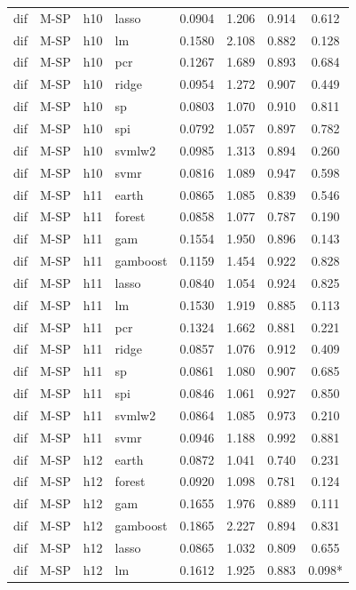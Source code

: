 \begin{ThreePartTable}
\begin{longtable}[t]{llclcccc}
dif & M-SP & h10 & lasso & 0.0904 & 1.206 & 0.914 & 0.612\\
dif & M-SP & h10 & lm & 0.1580 & 2.108 & 0.882 & 0.128\\
dif & M-SP & h10 & pcr & 0.1267 & 1.689 & 0.893 & 0.684\\
dif & M-SP & h10 & ridge & 0.0954 & 1.272 & 0.907 & 0.449\\
dif & M-SP & h10 & sp & 0.0803 & 1.070 & 0.910 & 0.811\\
dif & M-SP & h10 & spi & 0.0792 & 1.057 & 0.897 & 0.782\\
dif & M-SP & h10 & svmlw2 & 0.0985 & 1.313 & 0.894 & 0.260\\
dif & M-SP & h10 & svmr & 0.0816 & 1.089 & 0.947 & 0.598\\
\addlinespace
dif & M-SP & h11 & earth & 0.0865 & 1.085 & 0.839 & 0.546\\
dif & M-SP & h11 & forest & 0.0858 & 1.077 & 0.787 & 0.190\\
dif & M-SP & h11 & gam & 0.1554 & 1.950 & 0.896 & 0.143\\
dif & M-SP & h11 & gamboost & 0.1159 & 1.454 & 0.922 & 0.828\\
dif & M-SP & h11 & lasso & 0.0840 & 1.054 & 0.924 & 0.825\\
dif & M-SP & h11 & lm & 0.1530 & 1.919 & 0.885 & 0.113\\
dif & M-SP & h11 & pcr & 0.1324 & 1.662 & 0.881 & 0.221\\
dif & M-SP & h11 & ridge & 0.0857 & 1.076 & 0.912 & 0.409\\
dif & M-SP & h11 & sp & 0.0861 & 1.080 & 0.907 & 0.685\\
dif & M-SP & h11 & spi & 0.0846 & 1.061 & 0.927 & 0.850\\
dif & M-SP & h11 & svmlw2 & 0.0864 & 1.085 & 0.973 & 0.210\\
dif & M-SP & h11 & svmr & 0.0946 & 1.188 & 0.992 & 0.881\\
\addlinespace
dif & M-SP & h12 & earth & 0.0872 & 1.041 & 0.740 & 0.231\\
dif & M-SP & h12 & forest & 0.0920 & 1.098 & 0.781 & 0.124\\
dif & M-SP & h12 & gam & 0.1655 & 1.976 & 0.889 & 0.111\\
dif & M-SP & h12 & gamboost & 0.1865 & 2.227 & 0.894 & 0.831\\
dif & M-SP & h12 & lasso & 0.0865 & 1.032 & 0.809 & 0.655\\
dif & M-SP & h12 & lm & 0.1612 & 1.925 & 0.883 & 0.098*\\

\end{longtable}
\end{ThreePartTable}
